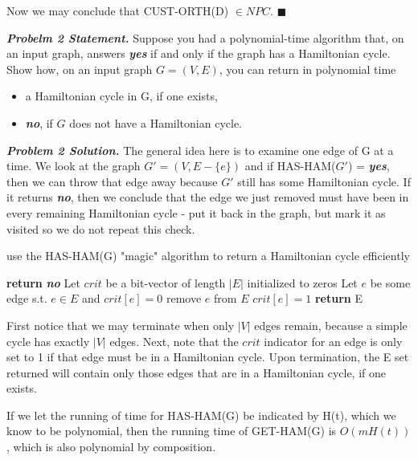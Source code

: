 \documentclass[10pt, letterpaper, twosided]{article}
\begin{document}
Now we may conclude that CUST-ORTH(D) $\in NPC$. $\blacksquare$\\

\newpage

\emph{\textbf{Probelm 2 Statement.}} Suppose you had a polynomial-time algorithm that, on an input graph, answers
\emph{\textbf{yes}} if and only if the graph has a Hamiltonian cycle.  Show how, on an input graph $G=(V,E)$, you can return 
in polynomial time
\begin{itemize}
\item a Hamiltonian cycle in G, if one exists,
\item \emph{\textbf{no}}, if $G$ does not have a Hamiltonian cycle.
\end{itemize}

\emph{\textbf{Problem 2 Solution.}} The general idea here is to examine one edge of G at a time.  We look at the graph 
$G' = (V, E-\{e\})$  and if HAS-HAM($G'$) = \emph{\textbf{yes}}, then we can throw that edge away because $G'$ still has some Hamiltonian cycle. If it returns \emph{\textbf{no}}, then we conclude that the edge we just removed must have been in every remaining Hamiltonian cycle - put it back in the graph, but mark it as visited so we do not repeat this check.

\begin{algorithm}
\caption{use the HAS-HAM(G) "magic" algorithm to return a Hamiltonian cycle efficiently}\label{ram}
\begin{algorithmic}[1]
      \State \textbf{return} \emph{\textbf{no}}
   \EndIf
   \State Let $crit$ be a bit-vector of length $|E|$ initialized to zeros
      \State Let $e$ be some edge s.t. $e \in E$ and $crit[e]=0$
         \State remove $e$ from $E$
      \Else
         \State $crit[e] = 1$
      \EndIf
   \EndWhile
   \State \textbf{return} E
\EndProcedure
\end{algorithmic}
\end{algorithm}

First notice that we may terminate when only $|V|$ edges remain, because a simple cycle has exactly $|V|$ edges.  Next,
note that the $crit$ indicator for an edge is only set to 1 if that edge must be in a Hamiltonian cycle.  Upon termination, the 
E set returned will contain only those edges that are in a Hamiltonian cycle, if one exists.

If we let the running of time for HAS-HAM(G) be indicated by H(t), which we know to be polynomial, then the running time
of GET-HAM(G) is $O(mH(t))$, which is also polynomial by composition.\\
\end{document}

